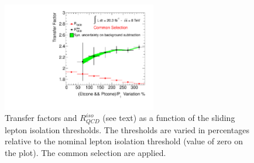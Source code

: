 \begin{figure}[ht]
	\begin{center}
	\includegraphics[width=0.60\textwidth]{figure/systematics/QCD_presel_SYS.pdf}
	\end{center}
	\caption{Transfer factors \rqcd and $R_{QCD}^{iso}$  (see text) as a function of the sliding lepton isolation 
	thresholds. The thresholds are varied in percentages relative to the nominal lepton isolation threshold (value of zero on the plot).
	The common selection are applied.
	 }
	\label{fig:os_ss_ratio}
\end{figure}


